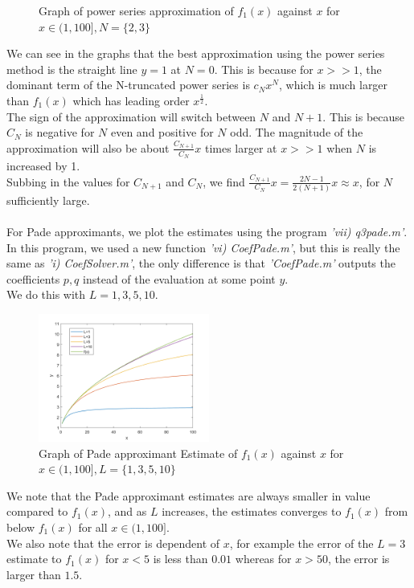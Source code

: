 \documentclass[10pt]{article}
\begin{document}
\begin{figure}[H]
\begin{minipage}[b]{0.47\linewidth}
            \caption{Graph of power series approximation of $f_1(x)$ against $x$ for $x\in(1,100],N=\{2,3\}$}
        \end{minipage}
\end{figure}
\noindent We can see in the graphs that the best approximation using the power series method is the straight line $y=1$ at $N=0$. This is because for $x>>1$, the dominant term of the N-truncated power series is $c_Nx^N$, which is much larger than $f_1(x)$ which has leading order $x^{\frac{1}{2}}$.\\
The sign of the approximation will switch between $N$ and $N+1$. This is because $C_N$ is negative for $N$ even and positive for $N$ odd. The magnitude of the approximation will also be about $\frac{C_{N+1}}{C_N}x$ times larger at $x>>1$ when $N$ is increased by 1. \\
Subbing in the values for $C_{N+1}$ and $C_N$, we find $\frac{C_{N+1}}{C_N}x=\frac{2N-1}{2(N+1)}x\approx x$, for $N$ sufficiently large.\\\\
\noindent For Pade approximants, we plot the estimates using the program \emph{'vii) q3\textunderscore pade.m'}. In this program, we used a new function \emph{'vi) CoefPade.m'}, but this is really the same as \emph{'i) CoefSolver.m'}, the only difference is that \textit{'CoefPade.m'} outputs the coefficients $p,q$ instead of the evaluation at some point $y$.\\
We do this with $L=1,3,5,10$.
\begin{figure}[H]
\centering
\includegraphics[width=0.5\textwidth]{Files/q3,pade.png}
\caption{Graph of Pade approximant Estimate of $f_1(x)$ against $x$ for $x\in(1,100],L=\{1,3,5,10\}$}
\end{figure}
\noindent We note that the Pade approximant estimates are always smaller in value compared to $f_1(x)$, and as $L$ increases, the estimates converges to $f_1(x)$ from below $f_1(x)$ for all $x\in(1,100]$. \\
We also note that the error is dependent of $x$, for example the error of the $L=3$ estimate to $f_1(x)$ for $x<5$ is less than $0.01$ whereas for $x>50$, the error is larger than $1.5$.\\
\end{document}
